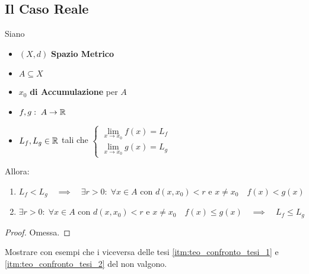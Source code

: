 \subsection{Il Caso Reale}
\begin{theorem}
	\label{teo:confronto}
	Siano
	\begin{itemize}[noitemsep]
		\item $(X,d)$ \textbf{Spazio Metrico}
		\item $A \subseteq X$
		\item $x_0$ \textbf{di Accumulazione} per $A$
		\item $f,g:\; A \to \mathbb{R}$
		\item $L_f, L_g \in \mathbb{R}$ tali che
			$\begin{cases}
				\lim\limits_{x \to x_0} f(x) = L_f\\
				\lim\limits_{x \to x_0} g(x) = L_g
			\end{cases}$
	\end{itemize}
	Allora:
	\begin{enumerate}
		\item \label{itm:teo_confronto_tesi_1}
			$L_f < L_g \quad \implies \quad \exists r > 0:\; \forall x \in A \text{ con } d(x, x_0) < r \text{ e } x \neq x_0 \quad f(x) < g(x)$
		\item  \label{itm:teo_confronto_tesi_2}
			$\exists r > 0:\; \forall x \in A \text{ con } d(x, x_0) < r \text{ e } x \neq x_0 \quad f(x) \leq g(x) \quad \implies \quad L_f \leq L_g$
	\end{enumerate}
	\begin{proof}
		Omessa.
	\end{proof}
\end{theorem}
\begin{exercise}
	Mostrare con esempi che i viceversa delle tesi \ref{itm:teo_confronto_tesi_1} e \ref{itm:teo_confronto_tesi_2} del  non valgono.
\end{exercise}

